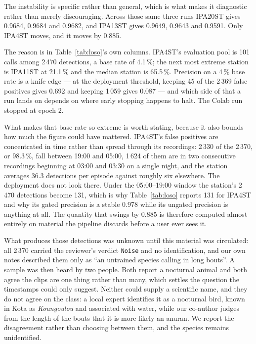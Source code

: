 \documentclass[review,3p,times]{elsarticle}
\begin{document}
The instability is specific rather than general, which is what makes it
diagnostic rather than merely discouraging. Across those same three runs IPA20ST
gives 0.9684, 0.9684 and 0.9682, and IPA13ST gives 0.9649, 0.9643 and 0.9591.
Only IPA4ST moves, and it moves by 0.885.

The reason is in Table~\ref{tab:loso}'s own columns. IPA4ST's evaluation pool is
101 calls among 2\,470 detections, a base rate of 4.1\,\%; the next most extreme
station is IPA11ST at 21.1\,\% and the median station is 65.5\,\%. Precision
on a 4\,\% base rate is a knife edge --- at the deployment threshold, keeping 45
of the 2\,369 false positives gives 0.692 and keeping 1\,059 gives 0.087 --- and
which side of that a run lands on depends on where early stopping happens to
halt. The Colab run stopped at epoch 2.

What makes that base rate so extreme is worth stating, because it also bounds
how much the figure could have mattered. IPA4ST's false positives are
concentrated in time rather than spread through its recordings: 2\,330 of the
2\,370, or 98.3\,\%, fall between 19:00 and 05:00, 1\,624 of them are in two
consecutive recordings beginning at 03:00 and 03:30 on a single night, and the
station averages 36.3 detections per episode against roughly six elsewhere. The
deployment does not look there. Under the 05:00--19:00 window the station's
2\,470 detections become 131, which is why Table~\ref{tab:loso} reports 131 for
IPA4ST and why its gated precision is a stable 0.978 while its ungated precision
is anything at all. The quantity that swings by 0.885 is therefore computed
almost entirely on material the pipeline discards before a user ever sees it.

What produces those detections was unknown until this material was circulated:
all 2\,370 carried the reviewer's verdict \texttt{Noise} and no identification,
and our own notes described them only as ``an untrained species calling in long
bouts''. A sample was then heard by two people. Both report a nocturnal animal
and both agree the clips are one thing rather than many, which settles the
question the timestamps could only suggest. Neither could supply a scientific
name, and they do not agree on the class: a local expert identifies it as a
nocturnal bird, known in Kota as \emph{Koungoulou} and associated with water,
while our co-author judges from the length of the bouts that it is more likely
an anuran. We report the disagreement rather than choosing between them, and the
species remains unidentified.
\end{document}

